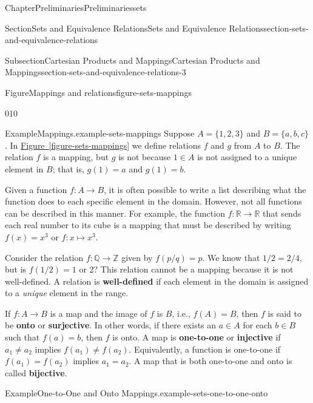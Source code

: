 \documentclass[oneside,10pt,]{book}
\newcommand{\xreffont}{\relax}
\newcommand{\terminology}[1]{\textbf{#1}}
\numberwithin{equation}{section}
\begin{document}
\begin{chapterptx}{Chapter}{Preliminaries}{}{Preliminaries}{}{}{sets}
\begin{sectionptx}{Section}{Sets and Equivalence Relations}{}{Sets and Equivalence Relations}{}{}{section-sets-and-equivalence-relations}
\begin{subsectionptx}{Subsection}{Cartesian Products and Mappings}{}{Cartesian Products and Mappings}{}{}{section-sets-and-equivalence-relations-3}
\begin{figureptx}{Figure}{Mappings and relations}{figure-sets-mappings}{}
\begin{image}{0}{1}{0}{}
{%
}%
\end{image}%
\tcblower
\end{figureptx}%
\begin{example}{Example}{Mappings.}{example-sets-mappings}%
Suppose \(A = \{1, 2, 3 \}\) and \(B = \{a, b, c \}\).  In \hyperref[figure-sets-mappings]{Figure~{\xreffont\ref{figure-sets-mappings}}} we define relations \(f\) and  \(g\) from \(A\) to \(B\).  The relation \(f\) is a mapping, but \(g\) is not because \(1 \in A\) is not assigned to a unique element in \(B\); that is, \(g(1) = a\) and \(g(1) = b\).%
\end{example}
Given a function \(f : A \rightarrow B\), it is often possible to write a list describing what the function does to each specific element in the domain.  However, not all functions can be described in this manner.  For example, the function \(f: {\mathbb R} \rightarrow {\mathbb R}\) that sends each real number to its cube is a mapping that must be described by writing \(f(x) = x^3\) or \(f:x \mapsto x^3\).%
\par
Consider the relation \(f : {\mathbb Q} \rightarrow {\mathbb Z}\) given by \(f(p/q) = p\).  We know that \(1/2 = 2/4\), but is \(f(1/2) = 1\) or 2?  This relation cannot be a mapping because it is not well-defined.  A relation is \terminology{well-defined} if each element in the domain is assigned to a \emph{unique} element in the range.%
\par
If \(f:A \rightarrow B\) is a map and the image of \(f\) is \(B\), i.e., \(f(A) = B\), then \(f\) is said to be \terminology{onto} or \terminology{surjective}. In other words, if there exists an \(a \in A\) for each \(b \in B\) such that \(f(a) = b\), then \(f\) is onto. A map is \terminology{one-to-one} or \terminology{injective} if \(a_1 \neq a_2\) implies \(f(a_1) \neq f(a_2)\).  Equivalently, a function is one-to-one if \(f(a_1) = f(a_2)\) implies \(a_1 = a_2\).  A map that is both one-to-one and onto is called \terminology{bijective}.%
\begin{example}{Example}{One-to-One and Onto Mappings.}{example-sets-one-to-one-onto}%

\end{example}
\end{subsectionptx}
\end{sectionptx}
\end{chapterptx}
\end{document}
